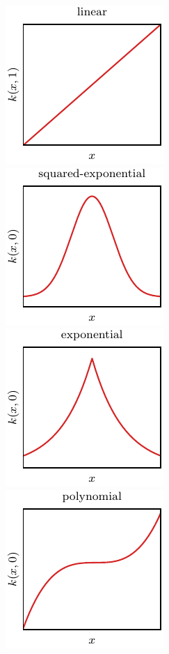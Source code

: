 \begin{figure}[t]
	\centering
	\includegraphics{../images/chap2_kernel_li.pdf} \hspace{3pt}
	\includegraphics{../images/chap2_kernel_se.pdf} \hspace{3pt}
	\includegraphics{../images/chap2_kernel_ex.pdf} \\[3pt]
	\includegraphics{../images/chap2_kernel_pl.pdf} \hspace{3pt}

\end{figure}
